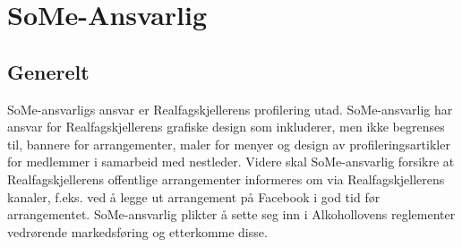 \documentclass{article}
\begin{document}
\section{SoMe-Ansvarlig}
\subsection{Generelt}
SoMe-ansvarligs ansvar er Realfagskjellerens profilering utad. SoMe-ansvarlig har ansvar for Realfagskjellerens grafiske design som inkluderer, men ikke begrenses til, bannere for arrangementer, maler for menyer og design av profileringsartikler for medlemmer i samarbeid med nestleder. \newline
Videre skal SoMe-ansvarlig forsikre at Realfagskjellerens offentlige arrangementer informeres om via Realfagskjellerens kanaler, f.eks. ved å legge ut arrangement på Facebook i god tid før arrangementet. \newline
SoMe-ansvarlig plikter å sette seg inn i Alkohollovens reglementer vedrørende markedsføring og etterkomme disse.
\end{document}
